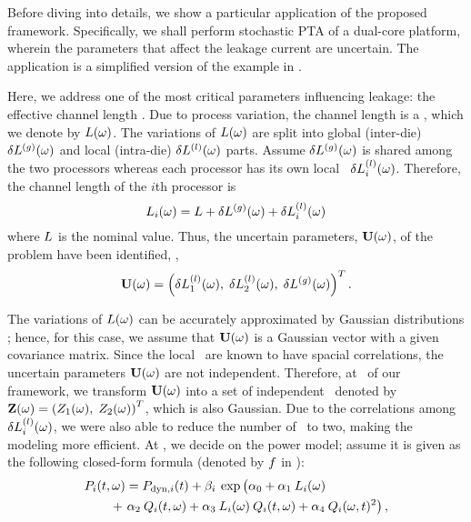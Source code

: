 Before diving into details, we show a particular application of the proposed framework. Specifically, we shall perform stochastic PTA of a dual-core platform, wherein the parameters that affect the leakage current are uncertain. The application is a simplified version of the example in .

Here, we address one of the most critical parameters influencing leakage: the effective channel length \cite{srivastava2010, chandra2010, juan2011, juan2012, shen2009}. Due to process variation, the channel length is a \rv, which we denote by $L(\omega)$. The variations of $L(\omega)$ are split into global (inter-die) ${\delta L^{(g)}}(\omega)$ and local (intra-die) $\delta L^{(l)}(\omega)$ parts. Assume ${\delta L^{(g)}}(\omega)$ is shared among the two processors whereas each processor has its own local \rv\ $\delta L^{(l)}_i(\omega)$. Therefore, the channel length of the $i$th processor is
\begin{equation} \elabel{leakage-partition}
  \Leff_i(\o) = \nLeff + \gLeff(\o) + \lLeff_i(\o)
\end{equation}
where $L$ is the nominal value. Thus, the uncertain parameters, $\mathbf{U}(\omega)$, of the problem have been identified, \ie,
\[
  \mathbf{U}(\omega) = \left(\delta L^{(l)}_1(\omega), \; \delta L^{(l)}_2(\omega), \; {\delta L^{(g)}}(\omega) \right)^T.
\]


The variations of $L(\omega)$ can be accurately approximated by Gaussian distributions \cite{srivastava2010, juan2011, juan2012}; hence, for this case, we assume that $\mathbf{U}(\omega)$ is a Gaussian vector with a given covariance matrix. Since the local \rvs\ are known to have spacial correlations, the uncertain parameters $\mathbf{U}(\omega)$ are not independent. Therefore, at \ of our framework, we transform $\mathbf{U}(\omega)$ into a set of independent \rvs\ denoted by $\mathbf{Z}(\omega) = \left(Z_1(\omega), \; Z_2(\omega)\right)^T$, which is also Gaussian. Due to the correlations among $\delta L^{(l)}_i(\omega)$, we were also able to reduce the number of \rvs\ to two, making the modeling more efficient. At , we decide on the power model; assume it is given as the following closed-form formula (denoted by $f$ in ):
\begin{align*}
  & \P_i(\t, \o) = \P_{\dyn, i}(\t) + \beta_i \: \exp \left(\vphantom{\T^2_i} \alpha_0 + \alpha_1 \: \Leff_i(\o) \right. \\
  & \qquad {} + \left. \alpha_2 \: \T_i(\t, \o) + \alpha_3 \: \Leff_i(\o) \: \T_i(\t, \o) + \alpha_4 \: \T_i(\o, \t)^2 \right),
\end{align*}
